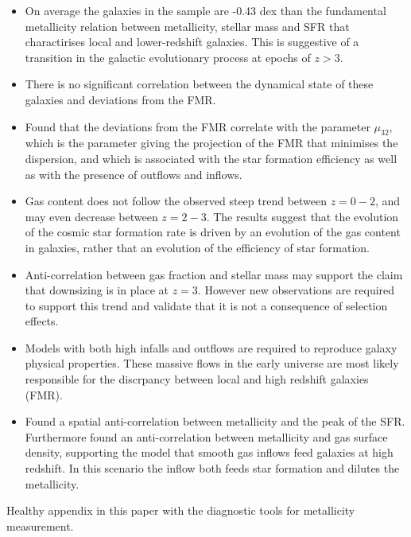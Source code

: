 \documentclass{literature}
\begin{document}
\begin{itemize}
	\item On average the galaxies in the sample are -0.43 dex than the fundamental metallicity relation between metallicity, stellar mass and SFR that charactirises local and lower-redshift galaxies. This is suggestive of a transition in the galactic evolutionary process at epochs of $z > 3$. 
	\item There is no significant correlation between the dynamical state of these galaxies and deviations from the FMR.
	\item Found that the deviations from the FMR correlate with the parameter $\mu_{32}$, which is the parameter giving the projection of the FMR that minimises the dispersion, and which is associated with the star formation efficiency as well as with the presence of outflows and inflows. 
	\item Gas content does not follow the observed steep trend between $z=0 - 2$, and may even decrease between $z=2-3$. The results suggest that the evolution of the cosmic star formation rate is driven by an evolution of the gas content in galaxies, rather that an evolution of the efficiency of star formation. 
	\item Anti-correlation between gas fraction and stellar mass may support the claim that downsizing is in place at $z=3$. However new observations are required to support this trend and validate that it is not a consequence of selection effects. 
	\item Models with both high infalls and outflows are required to reproduce galaxy physical properties. These massive flows in the early universe are most likely responsible for the discrpancy between local and high redshift galaxies (FMR). 
	\item Found a spatial anti-correlation between metallicity and the peak of the SFR. Furthermore found an anti-correlation between metallicity and gas surface density, supporting the model that smooth gas inflows feed galaxies at high redshift. In this scenario the inflow both feeds star formation and dilutes the metallicity. 
\end{itemize}

Healthy appendix in this paper with the diagnostic tools for metallicity measurement. 


\end{document}
